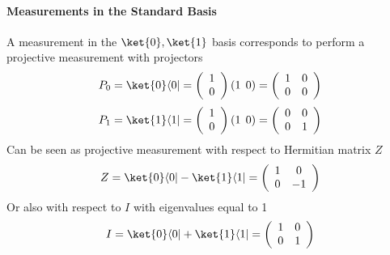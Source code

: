 \documentclass[10pt]{report}
\begin{document}
\paragraph{Measurements in the Standard Basis} A measurement in the $\ket{0}, \ket{1}$ basis corresponds to perform a projective measurement with projectors $$P_0 = \ket{0}\langle 0| = \left(\begin{array}{c}1\\0\end{array}\right) (1\:\:0) = \left(\begin{array}{c c}1&0\\0&0\end{array}\right)$$
$$P_1 = \ket{1}\langle 1| = \left(\begin{array}{c}1\\0\end{array}\right) (1\:\:0) = \left(\begin{array}{c c}0&0\\0&1\end{array}\right)$$
Can be seen as projective measurement with respect to Hermitian matrix $Z$
$$Z = \ket{0}\langle 0| - \ket{1}\langle 1| = \left(\begin{array}{c c}
1&0\\0&-1
\end{array}\right)$$
Or also with respect to $I$ with eigenvalues equal to 1
$$I = \ket{0}\langle 0| + \ket{1}\langle 1| = \left(\begin{array}{c c}
1&0\\0&1
\end{array}\right)$$
\end{document}
